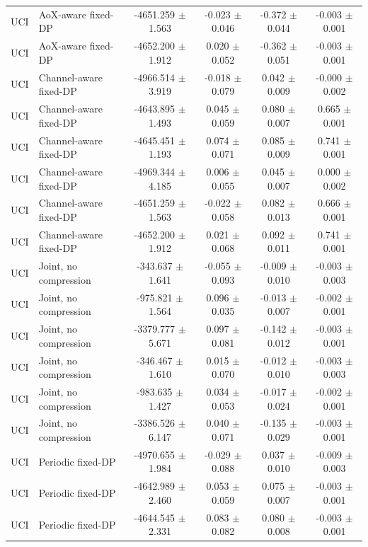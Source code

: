 \begin{tabular}{llcccc}
UCI & AoX-aware fixed-DP & -4651.259 $\pm$ 1.563 & -0.023 $\pm$ 0.046 & -0.372 $\pm$ 0.044 & -0.003 $\pm$ 0.001 \\
UCI & AoX-aware fixed-DP & -4652.200 $\pm$ 1.912 & 0.020 $\pm$ 0.052 & -0.362 $\pm$ 0.051 & -0.003 $\pm$ 0.001 \\
UCI & Channel-aware fixed-DP & -4966.514 $\pm$ 3.919 & -0.018 $\pm$ 0.079 & 0.042 $\pm$ 0.009 & -0.000 $\pm$ 0.002 \\
UCI & Channel-aware fixed-DP & -4643.895 $\pm$ 1.493 & 0.045 $\pm$ 0.059 & 0.080 $\pm$ 0.007 & 0.665 $\pm$ 0.001 \\
UCI & Channel-aware fixed-DP & -4645.451 $\pm$ 1.193 & 0.074 $\pm$ 0.071 & 0.085 $\pm$ 0.009 & 0.741 $\pm$ 0.001 \\
UCI & Channel-aware fixed-DP & -4969.344 $\pm$ 4.185 & 0.006 $\pm$ 0.055 & 0.045 $\pm$ 0.007 & 0.000 $\pm$ 0.002 \\
UCI & Channel-aware fixed-DP & -4651.259 $\pm$ 1.563 & -0.022 $\pm$ 0.058 & 0.082 $\pm$ 0.013 & 0.666 $\pm$ 0.001 \\
UCI & Channel-aware fixed-DP & -4652.200 $\pm$ 1.912 & 0.021 $\pm$ 0.068 & 0.092 $\pm$ 0.011 & 0.741 $\pm$ 0.001 \\
UCI & Joint, no compression & -343.637 $\pm$ 1.641 & -0.055 $\pm$ 0.093 & -0.009 $\pm$ 0.010 & -0.003 $\pm$ 0.003 \\
UCI & Joint, no compression & -975.821 $\pm$ 1.564 & 0.096 $\pm$ 0.035 & -0.013 $\pm$ 0.007 & -0.002 $\pm$ 0.001 \\
UCI & Joint, no compression & -3379.777 $\pm$ 5.671 & 0.097 $\pm$ 0.081 & -0.142 $\pm$ 0.012 & -0.003 $\pm$ 0.001 \\
UCI & Joint, no compression & -346.467 $\pm$ 1.610 & 0.015 $\pm$ 0.070 & -0.012 $\pm$ 0.010 & -0.003 $\pm$ 0.003 \\
UCI & Joint, no compression & -983.635 $\pm$ 1.427 & 0.034 $\pm$ 0.053 & -0.017 $\pm$ 0.024 & -0.002 $\pm$ 0.001 \\
UCI & Joint, no compression & -3386.526 $\pm$ 6.147 & 0.040 $\pm$ 0.071 & -0.135 $\pm$ 0.029 & -0.003 $\pm$ 0.001 \\
UCI & Periodic fixed-DP & -4970.655 $\pm$ 1.984 & -0.029 $\pm$ 0.088 & 0.037 $\pm$ 0.010 & -0.009 $\pm$ 0.003 \\
UCI & Periodic fixed-DP & -4642.989 $\pm$ 2.460 & 0.053 $\pm$ 0.059 & 0.075 $\pm$ 0.007 & -0.003 $\pm$ 0.001 \\
UCI & Periodic fixed-DP & -4644.545 $\pm$ 2.331 & 0.083 $\pm$ 0.082 & 0.080 $\pm$ 0.008 & -0.003 $\pm$ 0.001 \\

\end{tabular}
